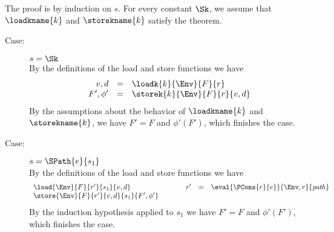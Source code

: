 %
{ The proof is by induction on $s$. For every constant $\Sk$, we
  assume that $\loadkname{k}$ and $\storekname{k}$ satisfy the theorem. 
\begin{description}
\item[Case:] $s = \Sk$\\[1ex]
%
By the definitions of the load and store functions we have 
\[ 
\begin{array}{rcl}
v,d  &=& \loadk{k}{\Env}{F}{r}\\
F',\phi' &=& \storek{k}{\Env}{F}{r}{v,d}\\
\end{array}
\]
By the assumptions about the behavior of $\loadkname{k}$ and
$\storekname{k}$, we have $F' = F$ and $\phi'(F')$, which finishes the
case.

\item[Case:] $s=\SPath{e}{s_1}$\\[1ex]
%
By the definitions of the load and store functions we have 
%
\[ 
\begin{array}{l}
\load{\Env}{F}{r'}{s_1}{v,d}\\
\store{\Env}{F}{r'}{v,d}{s_1}{F',\phi'}
\end{array} \hspace*{1cm}
\begin{array}{rcl}
r' & = & \eval{\PCons{r}{e}}{\Env,r}{\mathit{path}}\\
\\
\end{array}
\]
%
By the induction hypothesis applied to $s_1$ we have $F' = F$ and
$\phi'(F')$, which finishes the case.


\end{description}}
